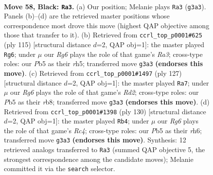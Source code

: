\documentclass[11pt]{article}
\begin{document}
\clearpage

\begin{figure}[p]\centering
\begin{subfigure}{0.46\textwidth}\centering
\resizebox{\linewidth}{!}{%
\newchessgame
\chessboard[
  setfen={5K2/8/8/1p5k/8/6r1/8/8 b - - 11 58},
  showmover=false,
  pgfstyle=straightmove, color=movearrow, markmove={g3-a3}
]}
\caption{}
\end{subfigure}\hfill
\begin{subfigure}{0.46\textwidth}\centering
\resizebox{\linewidth}{!}{%
\newchessgame
\chessboard[
  setfen={2k5/8/r7/7R/8/8/8/1K6 b - - 17 58},
  showmover=false,
  pgfstyle=straightmove, color=movearrow, markmove={a6-g6}
]}
\caption{}
\end{subfigure}
\\[4pt]
\begin{subfigure}{0.46\textwidth}\centering
\resizebox{\linewidth}{!}{%
\newchessgame
\chessboard[
  setfen={1R6/3r4/8/8/6k1/8/8/4K3 b - - 8 64},
  showmover=false,
  pgfstyle=straightmove, color=movearrow, markmove={d7-a7}
]}
\caption{}
\end{subfigure}\hfill
\begin{subfigure}{0.46\textwidth}\centering
\resizebox{\linewidth}{!}{%
\newchessgame
\chessboard[
  setfen={3k4/8/7r/8/2R5/8/8/3K4 w - - 9 66},
  showmover=false,
  pgfstyle=straightmove, color=movearrow, markmove={c4-b4}
]}
\caption{}
\end{subfigure}
\caption{\textbf{Move 58, Black: \texttt{Ra3}.} (a) Our position; Melanie plays \texttt{Ra3} (\texttt{g3a3}). Panels (b)--(d) are the retrieved master positions whose correspondence most drove this move (highest QAP objective among those that transfer to it). (b) Retrieved from \texttt{ccrl\_top\_p0001\#625} (ply 115) [structural distance $d$=2, QAP obj=1]: the master played \texttt{Rg6}; under $\mu$ our \emph{Rg6} plays the role of that game's \emph{Ra3}; cross-type roles: our \emph{P}b5 as their \emph{r}h5; transferred move \texttt{g3a3} \textbf{(endorses this move)}. (c) Retrieved from \texttt{ccrl\_top\_p0001\#1497} (ply 127) [structural distance $d$=2, QAP obj=1]: the master played \texttt{Ra7}; under $\mu$ our \emph{Rg6} plays the role of that game's \emph{Rd2}; cross-type roles: our \emph{P}b5 as their \emph{r}b8; transferred move \texttt{g3a3} \textbf{(endorses this move)}. (d) Retrieved from \texttt{ccrl\_top\_p0001\#1398} (ply 130) [structural distance $d$=2, QAP obj=1]: the master played \texttt{Rb4}; under $\mu$ our \emph{Rg6} plays the role of that game's \emph{Rc4}; cross-type roles: our \emph{P}b5 as their \emph{r}h6; transferred move \texttt{g3a3} \textbf{(endorses this move)}. Synthesis: 12 retrieved analogs transferred to \texttt{Ra3} (summed QAP objective 5, the strongest correspondence among the candidate moves); Melanie committed it via the \texttt{search} selector.}
\label{fig:thought-m115}
\end{figure}
\end{document}
